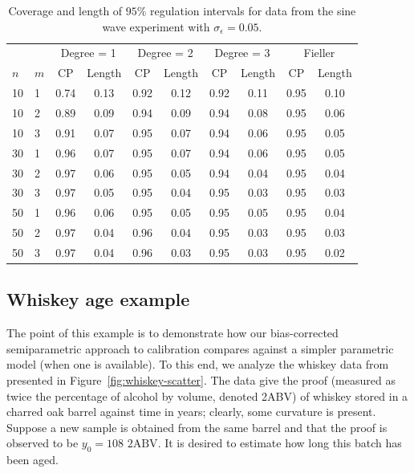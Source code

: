 \documentclass[cmfont,usenames,dvipsnames,leqno]{afit-etd}\usepackage[]{graphicx}\usepackage[]{color}
\begin{document}
\begin{table}[H]%
\centering
  \begin{tabular}{llcccccccc}
  \toprule
  \phantom{abc} & \phantom{abc} & \multicolumn{2}{c}{Degree = 1} & \multicolumn{2}{c}{Degree = 2} & \multicolumn{2}{c}{Degree = 3} & \multicolumn{2}{c}{Fieller} \\
  \cline{3-10}
  $n$ & $m$ & CP & Length & CP & Length & CP & Length & CP & Length \\
  \hline
  10  &  1  & 0.74 & 0.13 & 0.92 & 0.12 & 0.92 & 0.11 & 0.95 & 0.10 \\
  10  &  2  & 0.89 & 0.09 & 0.94 & 0.09 & 0.94 & 0.08 & 0.95 & 0.06 \\
  10  &  3  & 0.91 & 0.07 & 0.95 & 0.07 & 0.94 & 0.06 & 0.95 & 0.05 \\
  \hline
  30  &  1  & 0.96 & 0.07 & 0.95 & 0.07 & 0.94 & 0.06 & 0.95 & 0.05 \\
  30  &  2  & 0.97 & 0.06 & 0.95 & 0.05 & 0.94 & 0.04 & 0.95 & 0.04 \\
  30  &  3  & 0.97 & 0.05 & 0.95 & 0.04 & 0.95 & 0.03 & 0.95 & 0.03 \\
  \hline
  50  &  1  & 0.96 & 0.06 & 0.95 & 0.05 & 0.95 & 0.05 & 0.95 & 0.04 \\
  50  &  2  & 0.97 & 0.04 & 0.96 & 0.04 & 0.95 & 0.03 & 0.95 & 0.03 \\
  50  &  3  & 0.97 & 0.04 & 0.96 & 0.03 & 0.95 & 0.03 & 0.95 & 0.02 \\
  \bottomrule
  \end{tabular}
\caption[Semiparametric regulation Monte Carlo simulation]{Coverage and length of $95\%$ regulation intervals for data from the sine wave experiment with $\sigma_\epsilon = 0.05$. \label{tab:pspline-monte-carlo-2}}
\end{table}

\subsection{Whiskey age example}
\label{sec:whiskey}
The point of this example is to demonstrate how our bias-corrected semiparametric approach to calibration compares against a simpler parametric model (when one is available). To this end, we analyze the whiskey data from \citet{schoeneman_analytical_1971} presented in Figure~\ref{fig:whiskey-scatter}. The data give the proof (measured as twice the percentage of alcohol by volume, denoted 2ABV) of whiskey stored in a charred oak barrel against time in years; clearly, some curvature is present. Suppose a new sample is obtained from the same barrel and that the proof is observed to be $y_0 = 108 \text{ 2ABV}$. It is desired to estimate how long this batch has been aged.
\end{document}
